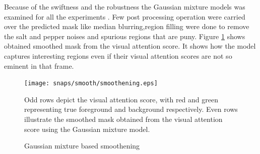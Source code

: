 \par Because of the swiftness and the robustness the Gaussian mixture models was examined for all the experiments . Few post processing operation were carried over the predicted mask like median blurring,region filling were done to remove the salt and pepper noises and spurious regions that are puny. Figure \ref{fig:smoothen}  shows obtained smoothed mask from the visual attention score. It shows how the model captures interesting regions even if their visual attention scores are not so eminent in that frame.
\begin{figure}[!htpb]
   \begin{center}
	    \texttt{[image: snaps/smooth/smoothening.eps]}     
     \caption {Gaussian mixture based smoothening}
 	\medskip 
 	\small Odd rows depict the visual attention score, with red and green representing true foreground and background respectively. Even rows illustrate the smoothed mask obtained from the visual attention score using the Gaussian mixture model. 
   \label{fig:smoothen}
   \end{center}
 \end{figure}



